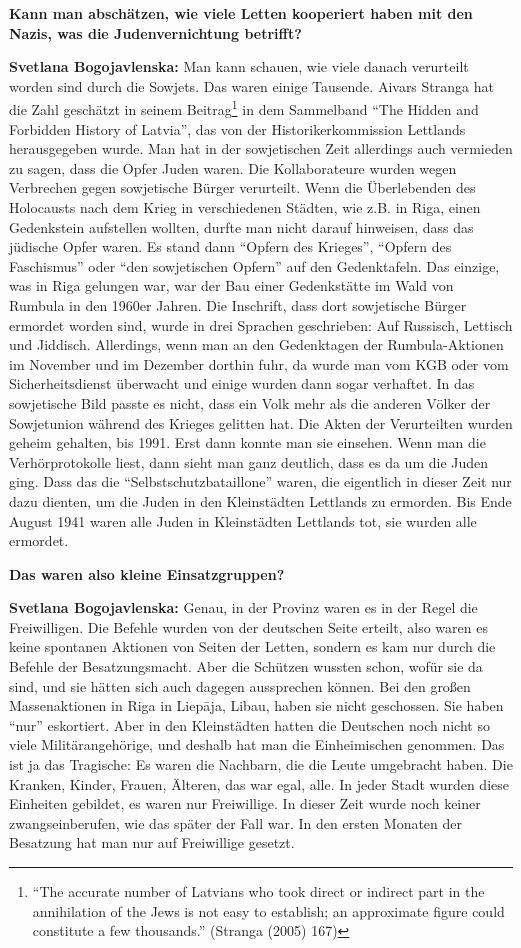 \textbf{Kann man abschätzen, wie viele Letten kooperiert haben mit den Nazis, was die Judenvernichtung betrifft?}

\textbf{Svetlana Bogojavlenska:} Man kann schauen, wie viele danach verurteilt worden sind durch die Sowjets. Das waren einige Tausende. Aivars Stranga hat die Zahl geschätzt in seinem Beitrag\footnote{``The accurate number of Latvians who took direct or indirect part in the annihilation of the Jews is not easy to establish; an approximate figure could constitute a few thousands.'' (Stranga (2005) 167) } in dem Sammelband "`The Hidden and Forbidden History of Latvia"', das von der Historikerkommission Lettlands herausgegeben wurde. Man hat in der sowjetischen Zeit allerdings auch vermieden zu sagen, dass die Opfer Juden waren. Die Kollaborateure wurden wegen Verbrechen gegen sowjetische Bürger verurteilt. Wenn die Überlebenden des Holocausts nach dem Krieg in verschiedenen Städten, wie z.B. in Riga, einen Gedenkstein aufstellen wollten, durfte man nicht darauf hinweisen, dass das jüdische Opfer waren. Es stand dann "`Opfern des Krieges"', "`Opfern des Faschismus"' oder "`den sowjetischen Opfern"' auf den Gedenktafeln. Das einzige, was in Riga gelungen war, war der Bau einer Gedenkstätte im Wald von Rumbula in den 1960er Jahren. Die Inschrift, dass dort sowjetische Bürger ermordet worden sind, wurde in drei Sprachen geschrieben: Auf Russisch, Lettisch und Jiddisch. Allerdings, wenn man an den Gedenktagen der Rumbula-Aktionen im November und im Dezember dorthin fuhr, da wurde man vom KGB oder vom Sicherheitsdienst überwacht und einige wurden dann sogar verhaftet. In das sowjetische Bild passte es nicht, dass ein Volk mehr als die anderen Völker der Sowjetunion während des Krieges gelitten hat. Die Akten der Verurteilten wurden geheim gehalten, bis 1991. Erst dann konnte man sie einsehen. Wenn man die Verhörprotokolle liest, dann sieht man ganz deutlich, dass es da um die Juden ging. Dass das die "`Selbstschutzbataillone"' waren, die eigentlich in dieser Zeit nur dazu dienten, um die Juden in den Kleinstädten Lettlands zu ermorden. Bis Ende August 1941 waren alle Juden in Kleinstädten Lettlands tot, sie wurden alle ermordet.
 
\textbf{Das waren also kleine Einsatzgruppen?}

\textbf{Svetlana Bogojavlenska:} Genau, in der Provinz waren es in der Regel die Freiwilligen. Die Befehle wurden von der deutschen Seite erteilt, also waren es keine spontanen Aktionen von Seiten der Letten, sondern es kam nur durch die Befehle der Besatzungsmacht. Aber die Schützen wussten schon, wofür sie da sind, und sie hätten sich auch dagegen aussprechen können.
Bei den großen Massenaktionen in Riga in Liepāja, Libau, haben sie nicht geschossen. Sie haben "`nur"' eskortiert. Aber in den Kleinstädten hatten die Deutschen noch nicht so viele Militärangehörige, und deshalb hat man die Einheimischen genommen. Das ist ja das Tragische: Es waren die Nachbarn, die die Leute umgebracht haben. Die Kranken, Kinder, Frauen, Älteren, das war egal, alle. In jeder Stadt wurden diese Einheiten gebildet, es waren nur Freiwillige. In dieser Zeit wurde noch keiner zwangseinberufen, wie das später der Fall war. In den ersten Monaten der Besatzung hat man nur auf Freiwillige gesetzt.

